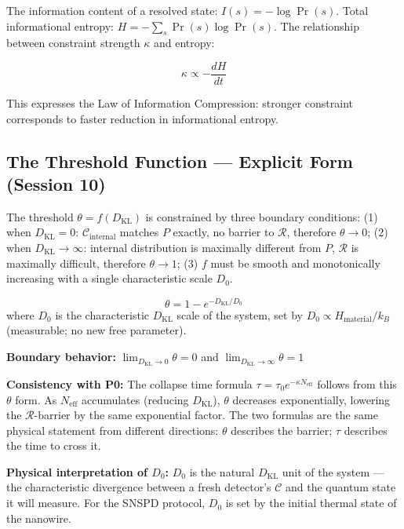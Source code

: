 \documentclass[12pt, a4paper]{article}
\begin{document}
The information content of a resolved state: $I(s) = -\log \Pr(s)$.
Total informational entropy: $H = -\sum_s \Pr(s)\log \Pr(s)$.
The relationship between constraint strength $\kappa$ and entropy:

\[
  \kappa \propto -\frac{dH}{dt}
\]

This expresses the Law of Information Compression: stronger constraint corresponds to
faster reduction in informational entropy.

\subsection{The Threshold Function --- Explicit Form (Session 10)}

The threshold $\theta = f(D_{\mathrm{KL}})$ is constrained by three boundary conditions:
(1) when $D_{\mathrm{KL}} = 0$: $\mathcal{C}_{\mathrm{internal}}$ matches $P$ exactly,
no barrier to $\mathcal{R}$, therefore $\theta \to 0$;
(2) when $D_{\mathrm{KL}} \to \infty$: internal distribution is maximally different
from $P$, $\mathcal{R}$ is maximally difficult, therefore $\theta \to 1$;
(3) $f$ must be smooth and monotonically increasing with a single characteristic scale $D_0$.

\begin{derivedbox}[title={Explicit Threshold Form --- Derived, Session 10}]
\[
  \boxed{\theta = 1 - e^{-D_{\mathrm{KL}}/D_0}}
\]
where $D_0$ is the characteristic $D_{\mathrm{KL}}$ scale of the system, set by
$D_0 \propto H_{\mathrm{material}}/k_B$ (measurable; no new free parameter).

\textbf{Boundary behavior:}
$\lim_{D_{\mathrm{KL}}\to 0}\theta = 0$ \quad and \quad $\lim_{D_{\mathrm{KL}}\to\infty}\theta = 1$

\textbf{Consistency with P0:} The collapse time formula
$\tau = \tau_0 e^{-\kappa N_{\mathrm{eff}}}$ follows from this $\theta$ form. As
$N_{\mathrm{eff}}$ accumulates (reducing $D_{\mathrm{KL}}$), $\theta$ decreases
exponentially, lowering the $\mathcal{R}$-barrier by the same exponential factor. The
two formulas are the same physical statement from different directions: $\theta$
describes the barrier; $\tau$ describes the time to cross it.

\textbf{Physical interpretation of $D_0$:} $D_0$ is the natural $D_{\mathrm{KL}}$
unit of the system --- the characteristic divergence between a fresh detector's
$\mathcal{C}$ and the quantum state it will measure. For the SNSPD protocol, $D_0$ is
set by the initial thermal state of the nanowire.
\end{derivedbox}
\end{document}

